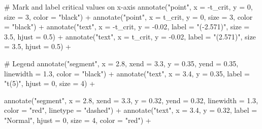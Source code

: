 \documentclass[
  letterpaper,
  DIV=11,
  numbers=noendperiod]{scrreprt}
\newenvironment{Shaded}{\begin{snugshade}}{\end{snugshade}}
\newcommand{\AttributeTok}[1]{\textcolor[rgb]{0.40,0.45,0.13}{#1}}
\newcommand{\CommentTok}[1]{\textcolor[rgb]{0.37,0.37,0.37}{#1}}
\newcommand{\DecValTok}[1]{\textcolor[rgb]{0.68,0.00,0.00}{#1}}
\newcommand{\FloatTok}[1]{\textcolor[rgb]{0.68,0.00,0.00}{#1}}
\newcommand{\FunctionTok}[1]{\textcolor[rgb]{0.28,0.35,0.67}{#1}}
\newcommand{\NormalTok}[1]{\textcolor[rgb]{0.00,0.23,0.31}{#1}}
\newcommand{\SpecialCharTok}[1]{\textcolor[rgb]{0.37,0.37,0.37}{#1}}
\newcommand{\StringTok}[1]{\textcolor[rgb]{0.13,0.47,0.30}{#1}}
\begin{document}
\begin{Shaded}
\begin{Highlighting}[]
  \CommentTok{\# Mark and label critical values on x{-}axis}
  \FunctionTok{annotate}\NormalTok{(}\StringTok{"point"}\NormalTok{, }\AttributeTok{x =} \SpecialCharTok{{-}}\NormalTok{t\_crit, }\AttributeTok{y =} \DecValTok{0}\NormalTok{, }\AttributeTok{size =} \DecValTok{3}\NormalTok{, }\AttributeTok{color =} \StringTok{"black"}\NormalTok{) }\SpecialCharTok{+}
  \FunctionTok{annotate}\NormalTok{(}\StringTok{"point"}\NormalTok{, }\AttributeTok{x =}\NormalTok{ t\_crit, }\AttributeTok{y =} \DecValTok{0}\NormalTok{, }\AttributeTok{size =} \DecValTok{3}\NormalTok{, }\AttributeTok{color =} \StringTok{"black"}\NormalTok{) }\SpecialCharTok{+}
  \FunctionTok{annotate}\NormalTok{(}\StringTok{"text"}\NormalTok{, }\AttributeTok{x =} \SpecialCharTok{{-}}\NormalTok{t\_crit, }\AttributeTok{y =} \SpecialCharTok{{-}}\FloatTok{0.02}\NormalTok{, }\AttributeTok{label =} \StringTok{"({-}2.571)"}\NormalTok{, }
           \AttributeTok{size =} \FloatTok{3.5}\NormalTok{, }\AttributeTok{hjust =} \FloatTok{0.5}\NormalTok{) }\SpecialCharTok{+}
  \FunctionTok{annotate}\NormalTok{(}\StringTok{"text"}\NormalTok{, }\AttributeTok{x =}\NormalTok{ t\_crit, }\AttributeTok{y =} \SpecialCharTok{{-}}\FloatTok{0.02}\NormalTok{, }\AttributeTok{label =} \StringTok{"(2.571)"}\NormalTok{, }
           \AttributeTok{size =} \FloatTok{3.5}\NormalTok{, }\AttributeTok{hjust =} \FloatTok{0.5}\NormalTok{) }\SpecialCharTok{+}
  
  \CommentTok{\# Legend}
  \FunctionTok{annotate}\NormalTok{(}\StringTok{"segment"}\NormalTok{, }\AttributeTok{x =} \FloatTok{2.8}\NormalTok{, }\AttributeTok{xend =} \FloatTok{3.3}\NormalTok{, }\AttributeTok{y =} \FloatTok{0.35}\NormalTok{, }\AttributeTok{yend =} \FloatTok{0.35}\NormalTok{,}
           \AttributeTok{linewidth =} \FloatTok{1.3}\NormalTok{, }\AttributeTok{color =} \StringTok{"black"}\NormalTok{) }\SpecialCharTok{+}
  \FunctionTok{annotate}\NormalTok{(}\StringTok{"text"}\NormalTok{, }\AttributeTok{x =} \FloatTok{3.4}\NormalTok{, }\AttributeTok{y =} \FloatTok{0.35}\NormalTok{, }\AttributeTok{label =} \StringTok{"t(5)"}\NormalTok{, }\AttributeTok{hjust =} \DecValTok{0}\NormalTok{, }\AttributeTok{size =} \DecValTok{4}\NormalTok{) }\SpecialCharTok{+}
  
  \FunctionTok{annotate}\NormalTok{(}\StringTok{"segment"}\NormalTok{, }\AttributeTok{x =} \FloatTok{2.8}\NormalTok{, }\AttributeTok{xend =} \FloatTok{3.3}\NormalTok{, }\AttributeTok{y =} \FloatTok{0.32}\NormalTok{, }\AttributeTok{yend =} \FloatTok{0.32}\NormalTok{,}
           \AttributeTok{linewidth =} \FloatTok{1.3}\NormalTok{, }\AttributeTok{color =} \StringTok{"red"}\NormalTok{, }\AttributeTok{linetype =} \StringTok{"dashed"}\NormalTok{) }\SpecialCharTok{+}
  \FunctionTok{annotate}\NormalTok{(}\StringTok{"text"}\NormalTok{, }\AttributeTok{x =} \FloatTok{3.4}\NormalTok{, }\AttributeTok{y =} \FloatTok{0.32}\NormalTok{, }\AttributeTok{label =} \StringTok{"Normal"}\NormalTok{, }\AttributeTok{hjust =} \DecValTok{0}\NormalTok{, }\AttributeTok{size =} \DecValTok{4}\NormalTok{, }\AttributeTok{color =} \StringTok{"red"}\NormalTok{) }\SpecialCharTok{+}
  

\end{Highlighting}
\end{Shaded}
\end{document}
